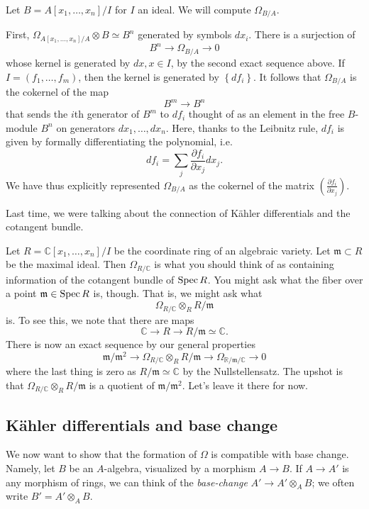 \begin{example} 
Let $B = A[x_1, \dots, x_n]/I$ for $I$ an ideal. We will compute $\Omega_{B/A}$.

First, $\Omega_{A[x_1, \dots, x_n]/A} \otimes B \simeq B^n$ generated by
symbols $dx_i$. There is a surjection of
\[ B^n \to \Omega_{B/A} \to 0  \]
whose kernel is generated by $dx, x \in I$, by the second exact sequence above.
If $I = (f_1, \dots, f_m)$, then the kernel is generated by 
$\left\{df_i\right\}$.
It follows that $\Omega_{B/A}$ is the cokernel of the map
\[ B^m \to B^n  \]
that sends the $i$th generator of $B^m$ to $df_i$ thought of as an element in
the free $B$-module $B^n$ on generators $dx_1, \dots, dx_n$. Here, thanks to
the Leibnitz rule, $df_i$ is
given by formally differentiating the polynomial, i.e.
\[ df_i = \sum_j \frac{\partial f_i}{\partial x_j} dx_j. \] We have thus
explicitly represented $\Omega_{B/A}$ as the cokernel of the matrix $\left(
\frac{\partial f_i}{\partial x_j}\right)$.
\end{example} 

Last time, we were talking about the connection of K\"ahler differentials and
the cotangent bundle.
\begin{example} 
Let $R = \mathbb{C}[x_1, \dots, x_n]/I$ be the coordinate ring of an algebraic
variety. Let $\mathfrak{m} \subset R$ be the maximal ideal. Then 
$\Omega_{R/\mathbb{C}}$ is what you should think of as containing information
of the cotangent bundle of $\operatorname{Spec} R$. You might ask what the fiber over a point
$\mathfrak{m} \in \operatorname{Spec} R$ is, though. That is, we might ask what
\[ \Omega_{R/\mathbb{C}} \otimes_R R/\mathfrak{m}  \]
is. To see this, we note that there are maps
\[ \mathbb{C} \to R \to R/\mathfrak{m} \simeq \mathbb{C}.  \]
There is now an exact sequence by our general properties
\[ \mathfrak{m}/\mathfrak{m}^2 \to \Omega_{R/\mathbb{C}} \otimes_R
R/\mathfrak{m} \to \Omega_{\mathbb{R}/\mathfrak{m}/\mathbb{C}} \to 0  \]
where the last thing is zero as $R/\mathfrak{m} \simeq \mathbb{C} $ by the
Nullstellensatz.
The upshot is that $\Omega_{R/\mathbb{C}} \otimes_R R/\mathfrak{m}$ is a
quotient of $\mathfrak{m}/\mathfrak{m}^2$. Let's leave it there for now.
\end{example} 

\subsection{K\"ahler differentials and base change}

We now want to show that the formation of $\Omega$ is compatible with base
change. Namely, let $B$ be an $A$-algebra, visualized by a morphism $ A \to B$.
If $A \to A'$ is any morphism of rings, we can think of the \emph{base-change}
$A' \to A' \otimes_A B$; we often write $B' =  A' \otimes_A B$.

